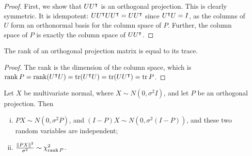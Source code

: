 \begin{proof}
	First, we show that \( UU^\intercal \) is an orthogonal projection.
	This is clearly symmetric.
	It is idempotent: \( U U^\intercal U U^\intercal = U U^\intercal \) since \( U^\intercal U = I \), as the columns of \( U \) form an orthonormal basis for the column space of \( P \).
	Further, the column space of \( P \) is exactly the column space of \( U U^\intercal \).
\end{proof}
\begin{proposition}
	The rank of an orthogonal projection matrix is equal to its trace.
\end{proposition}
\begin{proof}
	The rank is the dimension of the column space, which is \( \rank P = \rank(U^\intercal U) = \tr(U^\intercal U) = \tr(U U^\intercal) = \tr P \).
\end{proof}
\begin{theorem}
	Let \( X \) be multivariate normal, where \( X \sim N(0,\sigma^2 I) \), and let \( P \) be an orthogonal projection.
	Then
	\begin{enumerate}[(i)]
		\item \( PX \sim N(0,\sigma^2 P) \), and \( (I-P)X \sim N(0,\sigma^2(I-P)) \), and these two random variables are independent;
		\item \( \frac{\norm{PX}^2}{\sigma^2} \sim \chi^2_{\rank P} \).
	\end{enumerate}
\end{theorem}

